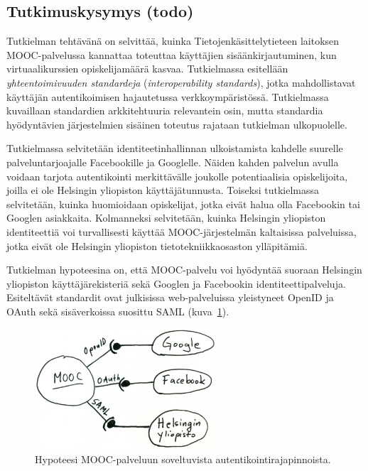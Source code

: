 \documentclass[finnish,gradu]{tktltiki}
\begin{document}
\subsection{Tutkimuskysymys (todo)} %
\label{sub:tutkimuskysymys}

Tutkielman tehtävänä on selvittää, kuinka Tietojenkäsittelytieteen laitoksen MOOC-palvelussa kannattaa toteuttaa käyttäjien sisäänkirjautuminen, kun virtuaalikurssien opiskelijamäärä kasvaa. Tutkielmassa esitellään \emph{yhteentoimivuuden standardeja} (\emph{interoperability standards}), jotka mahdollistavat käyttäjän autentikoimisen hajautetussa verkkoympäristössä. Tutkielmassa kuvaillaan standardien arkkitehtuuria relevantein osin, mutta standardia hyödyntävien järjestelmien sisäinen toteutus rajataan tutkielman ulkopuolelle.

Tutkielmassa selvitetään identiteetinhallinnan ulkoistamista kahdelle suurelle palveluntarjoajalle Facebookille ja Googlelle. Näiden kahden palvelun avulla voidaan tarjota autentikointi merkittävälle joukolle potentiaalisia opiskelijoita, joilla ei ole Helsingin yliopiston käyttäjätunnusta. Toiseksi tutkielmassa selvitetään, kuinka huomioidaan opiskelijat, jotka eivät halua olla Facebookin tai Googlen asiakkaita. Kolmanneksi selvitetään, kuinka Helsingin yliopiston identiteettiä voi turvallisesti käyttää MOOC-järjestelmän kaltaisissa palveluissa, jotka eivät ole Helsingin yliopiston tietotekniikkaosaston ylläpitämiä.

Tutkielman hypoteesina on, että MOOC-palvelu voi hyödyntää suoraan Helsingin yliopiston käyttäjärekisteriä sekä Googlen ja Facebookin identiteettipalveluja. Esiteltävät standardit ovat julkisissa web-palveluissa yleistyneet OpenID ja OAuth sekä sisäverkoissa suosittu SAML (kuva~\ref{fig:mooc-autentikointirajapinnat}).

\begin{figure}
  \centering
  \includegraphics[width=0.6\textwidth]{images/mooc-autentikointirajapinnat.jpg}
  \caption{Hypoteesi MOOC-palveluun soveltuvista autentikointirajapinnoista.}
  \label{fig:mooc-autentikointirajapinnat}
\end{figure}
\end{document}
